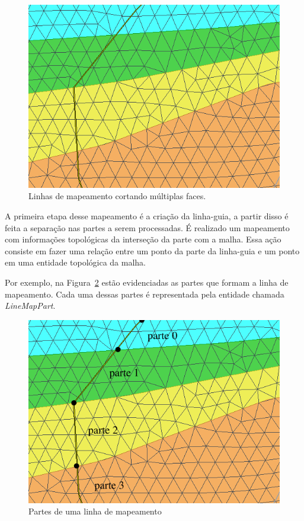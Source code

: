 \begin{figure} [h]
  \begin{center}
    \includegraphics[width=350pt]{images/fig-linhas-de-mapeamento-malhas}
    \caption{Linhas de mapeamento cortando múltiplas faces.}\label{fig-linemap-malhas}
  \end{center}
\end{figure}

A primeira etapa desse mapeamento é a criação da linha-guia, a partir disso é feita a separação nas partes a serem processadas. É realizado um mapeamento com informações topológicas da interseção da parte com a malha. Essa ação consiste em fazer uma relação entre um ponto da parte da linha-guia e um ponto em uma entidade topológica da malha.

Por exemplo, na Figura~\ref{fig-linemap-parts} estão evidenciadas as partes que formam a linha de mapeamento. Cada uma dessas partes é representada pela entidade chamada \textit{LineMapPart}.

\begin{figure} [h]
  \begin{center}
    \includegraphics[width=350pt]{images/lm-parts}
    \caption{Partes de uma linha de mapeamento}\label{fig-linemap-parts}
  \end{center}
\end{figure}

